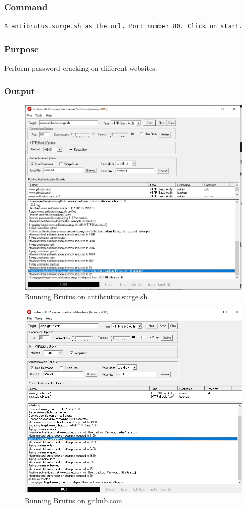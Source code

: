 \documentclass[11pt]{article}
\begin{document}
\subsubsection*{Command}
\begin{verbatim}
$ antibrutus.surge.sh as the url. Port number 80. Click on start. 
\end{verbatim}

\subsubsection*{Purpose}
Perform password cracking on different websites. 

\subsubsection*{Output}

\begin{figure}[H]
    \centering
    \includegraphics[height=0.5\textwidth]{brutus/brutus on antibrutus.png}
    \caption{Running Brutus on antibrutus.surge.sh}
\end{figure}

\begin{figure}[H]
    \centering
    \includegraphics[height=0.5\textwidth]{brutus/brutus on github.png}
    \caption{Running Brutus on github.com}
\end{figure}
\end{document}
